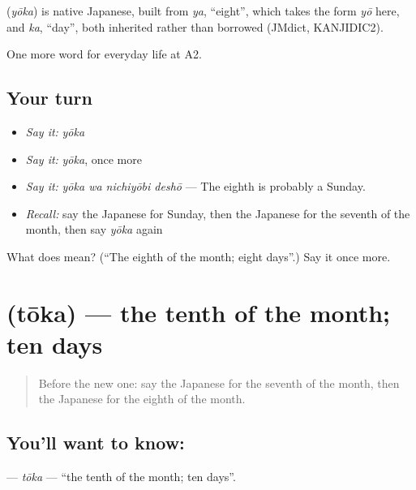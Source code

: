 \begin{cousinweb}
\textbf{} (\emph{yōka}) is native Japanese, built from \emph{ya}, \textquotedblleft{}eight\textquotedblright{}, which takes the form \emph{yō} here, and \emph{ka}, \textquotedblleft{}day\textquotedblright{}, both inherited rather than borrowed (JMdict, KANJIDIC2).
\end{cousinweb}

\begin{grammarlens}[title={What you've built}]
One more word for everyday life at A2.
\end{grammarlens}

\subsection*{Your turn}
\begin{itemize}
\raggedright
  \item \emph{Say it:} \emph{yōka}
  \item \emph{Say it:} \emph{yōka}, once more
  \item \emph{Say it:} \emph{yōka wa nichiyōbi deshō} — The eighth is probably a Sunday.
  \item \emph{Recall:} say the Japanese for Sunday, then the Japanese for the seventh of the month, then say \emph{yōka} again
\end{itemize}

\begin{tcolorbox}[breakable,colback=teal!4,colframe=teal!35!black,title={Before you move on}]
What does  mean? (\textquotedblleft{}The eighth of the month; eight days\textquotedblright{}.) Say it once more.
\end{tcolorbox}
\section[\texorpdfstring{\ja{とおか} (tōka)}{とおか (tōka)}]{ (tōka) — the tenth of the month; ten days}

\label{lesson:JA-C165-tooka}



\begin{quote}
Before the new one: say the Japanese for the seventh of the month, then the Japanese for the eighth of the month.
\end{quote}

\subsection*{You'll want to know: }
\textbf{} — \emph{tōka} — \textquotedblleft{}the tenth of the month; ten days\textquotedblright{}.

